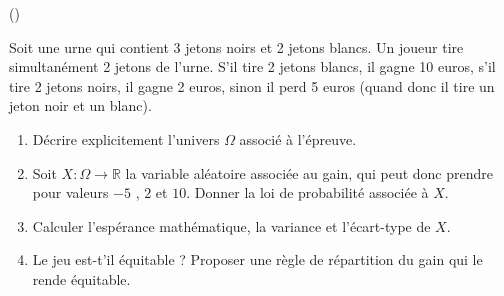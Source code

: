 \begin{exercice}\label{exo4-1} (\minsyndical)

Soit une urne qui contient 3 jetons noirs et 2 jetons blancs. Un joueur tire simultan\'ement 2 jetons de l'urne. S'il tire 2 jetons blancs, il gagne 10 euros, s'il tire 2 jetons noirs, il gagne 2 euros, sinon il perd 5 euros (quand donc il tire un jeton noir et un blanc).

\begin{enumerate}

\item D\'ecrire explicitement l'univers $\Omega$ associ\'e \`a l'\'epreuve.

\item Soit $X : \Omega \rightarrow \mathbb{R}$ la variable al\'eatoire associ\'ee au gain, qui peut donc prendre pour valeurs $-5$ , $2$ et $10$. Donner la loi de probabilit\'e associ\'ee \`a $X$.

\item Calculer l'esp\'erance math\'ematique, la variance et l'\'ecart-type de $X$.

\item Le jeu est-t'il \'equitable ? Proposer une r\`egle de r\'epartition du gain qui le rende \'equitable.\\

\end{enumerate}


\end{exercice}
